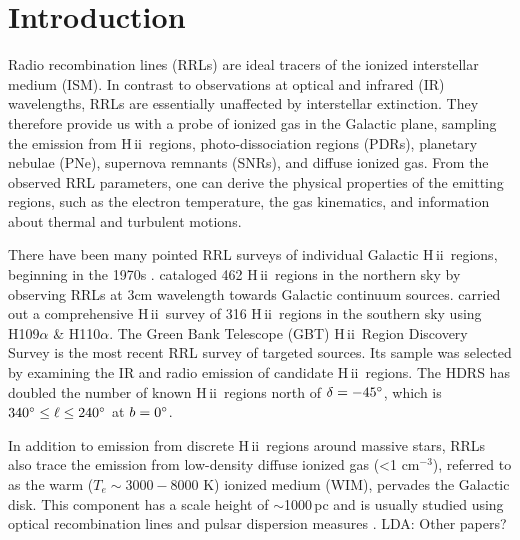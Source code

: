 \documentclass[manuscript]{aastex61}
\newcommand{\hii}{{\rm H\,}{{\sc ii}}}
\begin{document}
\section{Introduction} \label{sec_intr}
Radio recombination lines (RRLs) are ideal tracers of the ionized interstellar medium (ISM).
In contrast to observations at optical and infrared (IR) wavelengths, RRLs are essentially unaffected by interstellar extinction.  They therefore provide us with a probe of ionized gas in the Galactic plane, sampling the emission from \hii\ regions, photo-dissociation regions (PDRs), planetary nebulae (PNe), supernova remnants (SNRs), and diffuse ionized gas.  From the observed RRL parameters, one can derive the physical properties of the emitting regions, such as the electron temperature, the gas kinematics, and information about thermal and turbulent motions.

There have been many pointed RRL surveys of individual Galactic \hii\ regions, beginning in the 1970s \citep[e.g.][]{Reifenstein1970,Wilson1970}.
\citet{Lockman1989} cataloged 462 \hii\ regions in the northern sky by observing RRLs at 3cm wavelength towards Galactic continuum sources.
\citet{Caswell1987} carried out a comprehensive \hii\ survey of 316 \hii\ regions in the southern sky using H109$\alpha$ \& H110$\alpha$.
The Green Bank Telescope (GBT) \hii\ Region Discovery Survey \citep[GBT HRDS;][]{Bania2010,Anderson2011,Anderson2015b} is the most recent RRL survey of targeted sources.
Its sample was selected by examining the IR and radio emission of candidate \hii\ regions. 
The HDRS has doubled the number of known \hii\ regions north of $\delta=-45\mbox{$^\circ$}$, which is $340\mbox{$^\circ$} \leq \ell \leq 240\mbox{$^\circ$}$ at $b = 0\mbox{$^\circ$}$.

In addition to emission from discrete \hii\ regions around massive stars, RRLs also trace the emission from low-density diffuse ionized gas (\textless1 cm$^{-3}$), referred to as the warm ($T_e \sim 3000 - 8000$ K) ionized medium (WIM), pervades the Galactic disk.
This component has a scale height of $\sim$1000\,pc and is usually studied using optical recombination lines and pulsar dispersion measures \citep{Taylor1977,Reynolds1990}.
LDA: Other papers?
\end{document}
